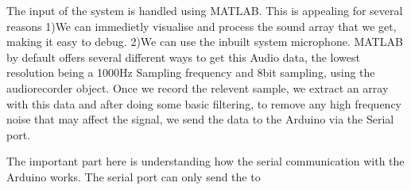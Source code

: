 The input of the system is handled using MATLAB. This is appealing for several reasons 
1)We can immedietly visualise and process the sound array that we get, making it easy to debug. 
2)We can use the inbuilt system microphone. 
MATLAB by default offers several different ways to get this Audio data, the lowest resolution being a 1000Hz Sampling frequency and 8bit sampling, using the audiorecorder object. Once we record the relevent sample, we extract an array with this data and after doing some basic filtering, to remove any high frequency noise that may affect the signal, we send the data to the Arduino via the Serial port. 

The important part here is understanding how the serial communication with the Arduino works. The serial port can only send the  to 